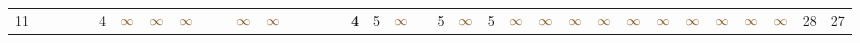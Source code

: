 \begin{landscape}
\begin{table}
\begin{adjustwidth}{-2.6cm}{}
{\begin{tabular}{l|lllllllllllllllllllllllllllllllll|ll}
		11   &            &                                                                 &                                                                 &                                                                 & 4                                                               & $\textcolor[rgb]{0.541,0.29,0.043}{\infty}$ & $\textcolor[rgb]{0.541,0.29,0.043}{\infty}$ & $\textcolor[rgb]{0.541,0.29,0.043}{\infty}$ &                                                                 &                                                                 & $\textcolor[rgb]{0.541,0.29,0.043}{\infty}$ & $\textcolor[rgb]{0.541,0.29,0.043}{\infty}$ &                                                                 &                                                                 &                                                                 &                                                                 & \textbf{4}                                                      & 5                                                               & $\textcolor[rgb]{0.541,0.29,0.043}{\infty}$ &                                                                 & 5                                                               & $\textcolor[rgb]{0.541,0.29,0.043}{\infty}$ & 5                                                               & $\textcolor[rgb]{0.541,0.29,0.043}{\infty}$ & $\textcolor[rgb]{0.541,0.29,0.043}{\infty}$ & $\textcolor[rgb]{0.541,0.29,0.043}{\infty}$ & $\textcolor[rgb]{0.541,0.29,0.043}{\infty}$ & $\textcolor[rgb]{0.541,0.29,0.043}{\infty}$ & $\textcolor[rgb]{0.541,0.29,0.043}{\infty}$ & $\textcolor[rgb]{0.541,0.29,0.043}{\infty}$ & $\textcolor[rgb]{0.541,0.29,0.043}{\infty}$ & $\textcolor[rgb]{0.541,0.29,0.043}{\infty}$ & $\textcolor[rgb]{0.541,0.29,0.043}{\infty}$ & 28         & 27          \\

\end{tabular}}
\end{adjustwidth}
\end{table}
\end{landscape}
